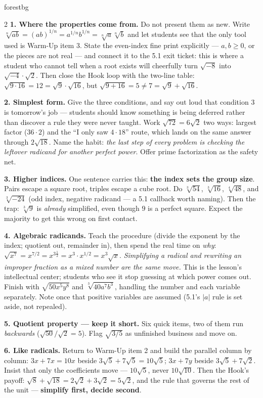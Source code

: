 \documentclass[10pt]{article}
\begin{document}
\begin{skillbox}[Lesson]{forestbg}
\begin{multicols}{2}
\textbf{1. Where the properties come from.} Do not present them as new. Write
$\sqrt[n]{ab}=(ab)^{1/n}=a^{1/n}b^{1/n}=\sqrt[n]{a}\sqrt[n]{b}$ and let students see that the only
tool used is Warm-Up item 3. State the even-index fine print explicitly --- $a,b\ge0$, or the
pieces are not real --- and connect it to the 5.1 exit ticket: this is where a student who cannot
tell when a root exists will cheerfully turn $\sqrt{-8}$ into $\sqrt{-4}\cdot\sqrt2$. Then close
the Hook loop with the two-line table: $\sqrt{9\cdot16}=12=\sqrt9\cdot\sqrt{16}$, but
$\sqrt{9+16}=5\ne7=\sqrt9+\sqrt{16}$.

\textbf{2. Simplest form.} Give the three conditions, and say out loud that condition 3 is
tomorrow's job --- students should know something is being deferred rather than discover a rule
they were never taught. Work $\sqrt{72}=6\sqrt2$ two ways: largest factor ($36\cdot2$) and the
``I only saw $4\cdot18$'' route, which lands on the same answer through $2\sqrt{18}$. Name the
habit: \emph{the last step of every problem is checking the leftover radicand for another perfect
power}. Offer prime factorization as the safety net.

\columnbreak

\textbf{3. Higher indices.} One sentence carries this: \textbf{the index sets the group size}.
Pairs escape a square root, triples escape a cube root. Do $\sqrt[3]{54}$, $\sqrt[3]{16}$,
$\sqrt[4]{48}$, and $\sqrt[3]{-24}$ (odd index, negative radicand --- a 5.1 callback worth naming).
Then the trap: $\sqrt[3]{9}$ is \emph{already} simplified, even though $9$ is a perfect square.
Expect the majority to get this wrong on first contact.

\textbf{4. Algebraic radicands.} Teach the procedure (divide the exponent by the index; quotient
out, remainder in), then spend the real time on \emph{why}: $\sqrt{x^7}=x^{7/2}=x^{3\frac12}
=x^{3}\cdot x^{1/2}=x^{3}\sqrt x$. \emph{Simplifying a radical and rewriting an improper fraction
as a mixed number are the same move.} This is the lesson's intellectual center; students who see it
stop guessing at which power comes out. Finish with $\sqrt{50x^5y^8}$ and $\sqrt[3]{40a^7b^3}$,
handling the number and each variable separately. Note once that positive variables are assumed
(5.1's $|a|$ rule is set aside, not repealed).

\textbf{5. Quotient property --- keep it short.} Six quick items, two of them run
\emph{backwards} ($\sqrt{50}/\sqrt2=5$). Flag $\sqrt{3/5}$ as unfinished business and move on.

\textbf{6. Like radicals.} Return to Warm-Up item 2 and build the parallel column by column:
$3x+7x=10x$ beside $3\sqrt5+7\sqrt5=10\sqrt5$; $3x+7y$ beside $3\sqrt5+7\sqrt2$. Insist that only
the coefficients move --- $10\sqrt5$, never $10\sqrt{10}$. Then the Hook's payoff:
$\sqrt8+\sqrt{18}=2\sqrt2+3\sqrt2=5\sqrt2$, and the rule that governs the rest of the unit ---
\textbf{simplify first, decide second}.
\end{multicols}
\end{skillbox}
\end{document}
